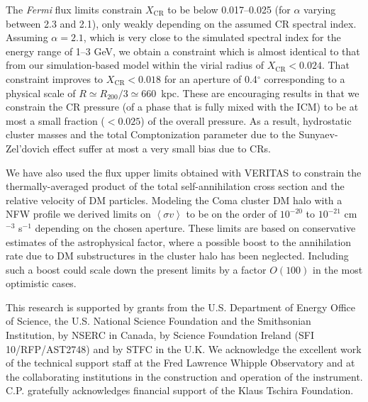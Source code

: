 \documentclass[12pt,manuscript]{aastex}
\def\Fermi{{\em Fermi}\xspace}
\newcommand{\expval}[1]{\left\langle #1 \right\rangle}
\newcommand{\CR}{\mathrm{CR}}
\begin{document}
The \Fermi flux limits constrain $X_\CR$ to be below 0.017--0.025 (for $\alpha$ varying
between 2.3 and 2.1), only weakly depending on the assumed CR spectral index. Assuming $\alpha=2.1$,
which is very close to the simulated spectral index for the energy range of 1--3 GeV, we obtain 
a constraint which is almost identical to that from our simulation-based model within the virial
radius of $X_\CR<0.024$. That constraint improves to $X_{\CR}<0.018$ for an aperture of 0.4$^\circ$
corresponding to a physical scale of $R \simeq R_{200}/3 \simeq 660$~kpc. These are encouraging
results in that we constrain the CR pressure (of a phase that is fully mixed with the ICM) to be at
most a small fraction ($<0.025$) of the overall pressure. As a result, hydrostatic cluster masses
and the total Comptonization parameter due to the Sunyaev-Zel'dovich effect suffer at most a very
small bias due to CRs.

We have also used the flux upper limits obtained with VERITAS to constrain the thermally-averaged
product of the total self-annihilation cross section and the relative velocity of DM
particles. Modeling the Coma cluster DM halo with a NFW profile we derived limits on
$\expval{\sigma v}$ to be on the order of $10^{-20}$ to $10^{-21}$ cm$^{-3}$ s$^{-1}$ depending on
the chosen aperture. These limits are based on conservative estimates of the astrophysical factor,
where a possible boost to the annihilation rate due to DM substructures in the cluster halo has
been neglected. Including such a boost could scale down the present limits by a factor $O(100)$ in
the most optimistic cases.

\acknowledgments
This research is supported by grants from the U.S. Department of Energy Office of Science, the U.S.
National Science Foundation and the Smithsonian Institution, by NSERC in Canada, by Science
Foundation Ireland (SFI 10/RFP/AST2748) and by STFC in the U.K. We acknowledge the excellent work
of the technical support staff at the Fred Lawrence Whipple Observatory and at the collaborating
institutions in the construction and operation of the instrument. C.P. gratefully acknowledges 
financial support of the Klaus Tschira Foundation.




\end{document}
